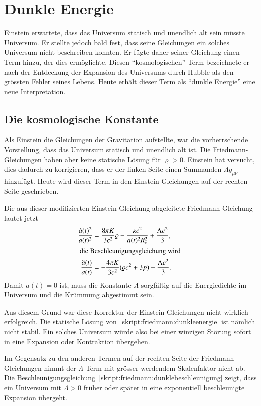 \section{Dunkle Energie}
Einstein erwartete, dass das Universum statisch und unendlich alt sein
müsste Universum.
Er stellte jedoch bald fest, dass seine Gleichungen ein solches Universum
nicht beschreiben konnten.
Er fügte daher seiner Gleichung einen Term hinzu, der dies ermöglichte.
Diesen ``kosmologischen'' Term bezeichnete er nach der
Entdeckung der Expansion des Universums durch Hubble als
den grössten Fehler seines Lebens.
Heute erhält dieser Term als ``dunkle Energie'' eine neue Interpretation.

\subsection{Die kosmologische Konstante}
Als Einstein die Gleichungen der Gravitation aufstellte, war die
vorherrschende Vorstellung, dass das Universum statisch und unendlich
alt ist.
Die Friedmann-Gleichungen haben aber keine statische Lösung
für $\varrho>0$.
Einstein hat versucht, dies dadurch zu korrigieren, dass er der
linken Seite einen Summanden $\Lambda g_{\mu\nu}$ hinzufügt.
Heute wird dieser Term in den Einstein-Gleichungen auf der rechten
Seite geschrieben.

Die aus dieser modifizierten Einstein-Gleichung abgeleitete
Friedmann-Gleichung lautet jetzt
\begin{align}
\frac{\dot a(t)^2}{a(t)^2}
&=
\frac{8\pi K}{3c^2}\varrho - \frac{\kappa c^2}{a(t)^2R_c^2} + \frac{\Lambda c^2}{3},
\label{skript:friedmann:dunkleenergie}
\\
\intertext{
die Beschleunigungsgleichung wird
}
\frac{\ddot a(t)}{a(t)}
&=
-\frac{4\pi K}{3c^2}(\varrho c^2+3p) + \frac{\Lambda c^2}{3}.
\label{skript:friedmann:dunklebeschleunigung}
\end{align}
Damit $\dot a(t)=0$ ist, muss die Konstante $\Lambda$ sorgfältig auf
die Energiedichte im Universum und die Krümmung abgestimmt sein.

Aus diesem Grund war diese Korrektur der Einstein-Gleichungen nicht
wirklich erfolgreich.
Die statische Lösung von~\eqref{skript:friedmann:dunkleenergie}
ist nämlich nicht stabil.
Ein solches Universum würde also bei einer winzigen Störung sofort
in eine Expansion oder Kontraktion übergehen.

Im Gegensatz zu den anderen Termen auf der rechten Seite der
Friedmann-Gleichungen nimmt der $\Lambda$-Term mit grösser werdendem
Skalenfaktor nicht ab.
Die Beschleunigungsgleichung~\eqref{skript:friedmann:dunklebeschleunigung}
zeigt, dass ein Universum mit $\Lambda > 0$ früher oder später
in eine exponentiell beschleunigte Expansion übergeht.

